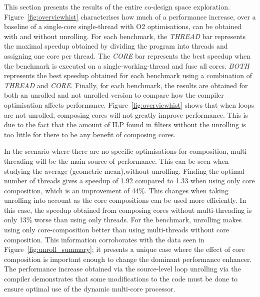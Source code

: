 This section  presents the results of the entire co-design space exploration.
Figure~\ref{fig:overviewhist} characterises how much of a performance increase, over a baseline of a single-core single-thread with O2 optimisations, can be obtained with and without unrolling.
For each benchmark, the \textit{THREAD} bar represents the maximal speedup obtained by dividing the program into threads and assigning one core per thread.
The \textit{CORE} bar represents the best speedup when the benchmark is executed on a single-working-thread and fuse all cores.
\textit{BOTH} represents the best speedup obtained for each benchmark using a combination of \textit{THREAD} and \textit{CORE}.
Finally, for each benchmark, the results are obtained for both an unrolled and not unrolled version to compare how the compiler optimisation affects performance.
Figure~\ref{fig:overviewhist} shows that when loops are not unrolled, composing cores will not greatly improve performance.
This is due to the fact that the amount of ILP found in filters without the unrolling is too little for there to be any benefit of composing cores.

In the scenario where there are no specific optimisations for composition, multi-threading will be the main source of performance.
This can be seen when studying the average (geometric mean),without unrolling.
Finding the optimal number of threads gives a speedup of 1.92 compared to 1.33 when using only core composition, which is an improvement of 44\%.
This changes when taking unrolling into account as the core compositions can be used more efficiently.
In this case, the speedup obtained from composing cores without multi-threading is only 13\% worse than using only threads.
For the  benchmark, unrolling makes using only core-composition better than using multi-threads without core composition.
This information corroborates with the data seen in Figure~\ref{fig:unroll_summary}; it presents a unique case where the effect of core composition is important enough to change the dominant performance enhancer.
The performance increase obtained via the source-level loop unrolling via the compiler demonstrates that some modifications to the code must be done to ensure optimal use of the dynamic multi-core processor.

